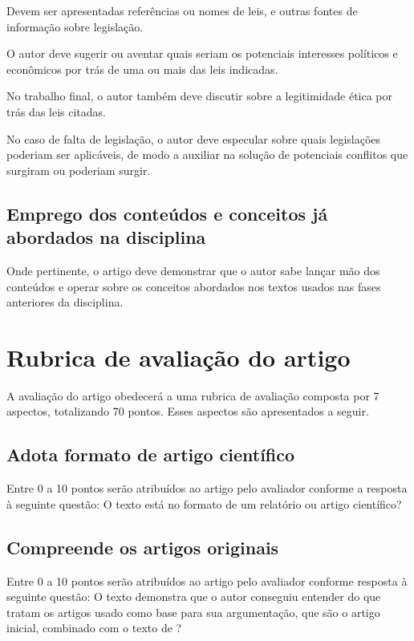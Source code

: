 \documentclass[12pt]{article}
\begin{document}
	Devem ser apresentadas referências ou nomes de leis, e outras fontes de informação sobre legislação.

	O autor deve sugerir ou aventar quais seriam os potenciais interesses políticos e econômicos por trás de uma ou mais das leis indicadas.

	No trabalho final, o autor também deve discutir sobre a legitimidade ética por trás das leis citadas.

	No caso de falta de legislação, o autor deve especular sobre quais legislações poderiam ser aplicáveis, de modo a auxiliar na solução de potenciais conflitos que surgiram ou poderiam surgir.

	\subsection{\label{conteudos}Emprego dos conteúdos e conceitos já abordados na disciplina}

	Onde pertinente, o artigo deve demonstrar que o autor sabe lançar mão dos conteúdos e operar sobre os conceitos abordados nos textos usados nas fases anteriores da disciplina.

	\section{\label{rubrica}Rubrica de avaliação do artigo}
	A avaliação do artigo obedecerá a uma rubrica de avaliação composta por 7 aspectos, totalizando 70 pontos. Esses aspectos são apresentados a seguir.

	\subsection{Adota formato de artigo científico}
	Entre 0 a 10 pontos serão atribuídos ao artigo pelo avaliador conforme a resposta à seguinte questão: O texto está no formato de um relatório ou artigo científico?

	\subsection{Compreende os artigos originais}

	Entre 0 a 10 pontos serão atribuídos ao artigo pelo avaliador conforme resposta à seguinte questão: O texto demonstra que o autor conseguiu entender do que tratam os artigos usado como base para sua argumentação, que são o artigo inicial, combinado com o texto de \citet{jones_teaching_2016}?
\end{document}
